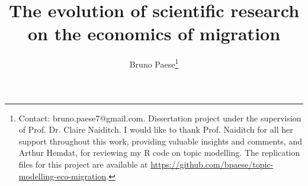 \documentclass[a4paper, 10pt]{article}
\title{The evolution of scientific research on the economics of migration}
\author{Bruno Paese\thanks{Contact: bruno.paese7@gmail.com. Dissertation project under the supervision of Prof. Dr. Claire Naiditch. I would like to thank Prof. Naiditch for all her support throughout this work, providing valuable insights and comments, and Arthur Hemdat, for reviewing my R code on topic modelling. The replication files for this project are available at \url{https://github.com/bpaese/topic-modelling-eco-migration}.}}
\date{}
\begin{document}
\renewcommand{\labelenumii}{\arabic{enumi}.\arabic{enumii}}

\maketitle















\newpage



\newpage


\end{document}
